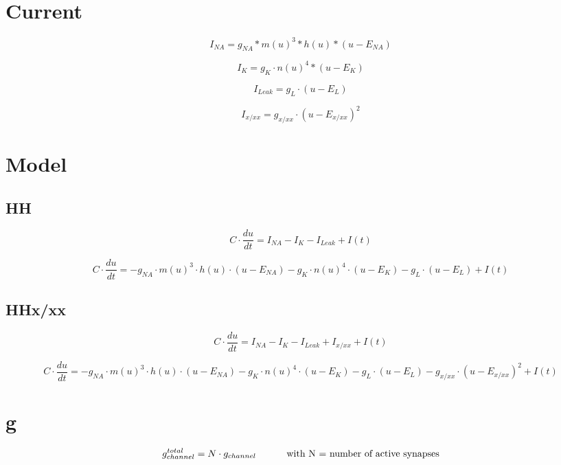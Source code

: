\documentclass[a4paper,oneside]{article}
\begin{document}
\section{Current}
$$
I_{NA} = g_{NA}*m(u)^3*h(u)*(u-E_{NA})
$$

$$
I_K = g_K \cdot n(u)^4*(u-E_K)
$$

$$
I_{Leak} = g_L \cdot (u-E_L)
$$

$$
I_{x/xx} = g_{x/xx} \cdot (u-E_{x/xx})^2
$$


\section{Model}



\subsection{HH}

$$
C \cdot \frac{du}{dt} = I_{NA} - I_K - I_{Leak} + I(t)
$$

$$
C \cdot \frac{du}{dt} = -g_{NA} \cdot m(u)^3 \cdot h(u) \cdot (u-E_{NA})-g_K \cdot n(u)^4 \cdot (u-E_K)-g_L \cdot (u-E_L)+I(t)
$$


\subsection{HHx/xx}

$$
C \cdot \frac{du}{dt} = I_{NA} - I_K - I_{Leak} + I_{x/xx} + I(t)
$$

$$
C \cdot \frac{du}{dt} = -g_{NA} \cdot m(u)^3 \cdot h(u) \cdot (u-E_{NA})-g_K \cdot n(u)^4 \cdot (u-E_K)-g_L \cdot (u-E_L) - g_{x/xx} \cdot (u-E_{x/xx})^2+I(t)
$$






\section{g}

$$
g^{total}_{channel} = N \cdot g_{channel} \text{\hspace*{1cm} with N = number of active synapses}
$$
\end{document}
